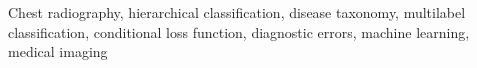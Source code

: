 Chest radiography, hierarchical classification, disease taxonomy, multilabel classification, conditional loss function, diagnostic errors, machine learning, medical imaging
